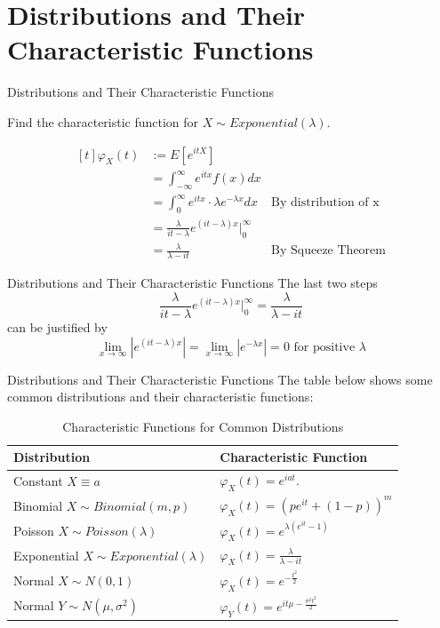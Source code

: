 \documentclass{beamer}
\begin{document}
\section{Distributions and Their Characteristic Functions}
\begin{frame}{Distributions and Their Characteristic Functions}
	\begin{example}
		Find the characteristic function for $X\sim Exponential(\lambda)$.
	\end{example}\pause
	$$
	\begin{aligned}[t]
	\varphi_X(t) &:=E[e^{itX}] &\\
	&=\int_{-\infty}^\infty e^{itx}f(x)dx & \\
	&=\int_0^\infty e^{itx}\cdot \lambda e^{-\lambda x}dx & \text{By distribution of x} \\
	&=\frac{\lambda}{it-\lambda}e^{(it-\lambda)x} \bigg|_0^\infty & \\
	&=\frac{\lambda}{\lambda-it} & \text{By Squeeze Theorem}
	\end{aligned}
	$$
\end{frame}
\begin{frame}{Distributions and Their Characteristic Functions}
The last two steps$$\frac{\lambda}{it-\lambda}e^{(it-\lambda)x} \bigg|_0^\infty
=\frac{\lambda}{\lambda-it}$$ can be justified by
$$\lim\limits_{x\to\infty}|e^{(it-\lambda)x}| = \lim\limits_{x\to\infty}|e^{-\lambda x}|
=0 \text{ for positive }\lambda$$
\end{frame}
\begin{frame}{Distributions and Their Characteristic Functions}
The table below shows some common distributions and their characteristic functions:
\begin{table}[ht]
	\caption{Characteristic Functions for Common Distributions}
	\centering
	\begin{tabular}{l l}
		\hline\hline
		Distribution\ & Characteristic Function\\
		\hline
		Constant $X\equiv a$                      & $\varphi_X(t) = e^{iat}.$                    \\
		Binomial $X\sim Binomial(m,p)$            & $\varphi_X(t) = (pe^{it} + (1-p))^m$            \\
		Poisson $X\sim Poisson(\lambda)$          & $ \varphi_X(t)=e^{\lambda(e^{it}-1)} $          \\
		Exponential $X \sim Exponential(\lambda)$ & $\varphi_X(t)=\frac{\lambda}{\lambda-it}$       \\
		Normal $X\sim N(0,1)$                     & $\varphi_X(t)=e^{-\frac{t^2}{2}}$               \\
		Normal $Y\sim N(\mu,\sigma ^2)$           & $\varphi_Y(t)=e^{it\mu-\frac{\sigma^2 t^2}{2}}$
	\end{tabular}
\end{table}
\end{frame}
\end{document}
